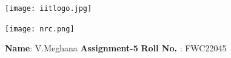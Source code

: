 \documentclass[10pt,a4paper]{report}
\begin{document}
\begin{figure*}[!tbp]
  \centering
  \begin{minipage}[b]{0.4\textwidth}
    \texttt{[image: iitlogo.jpg]}
  \end{minipage}
  \hfill
  \vspace{5mm}\begin{minipage}[b]{0.4\textwidth}
\raggedleft  \texttt{[image: nrc.png]}\

  \end{minipage}\vspace{0.2cm}
\end{figure*}
\raggedright \textbf{Name}:\hspace{1mm} V.Meghana \hspace{3cm} \Large \textbf{Assignment-5}\hspace{2.5cm} %
\normalsize \textbf{Roll No.} :\hspace{1mm} FWC22045\vspace{1cm}
\end{document}
